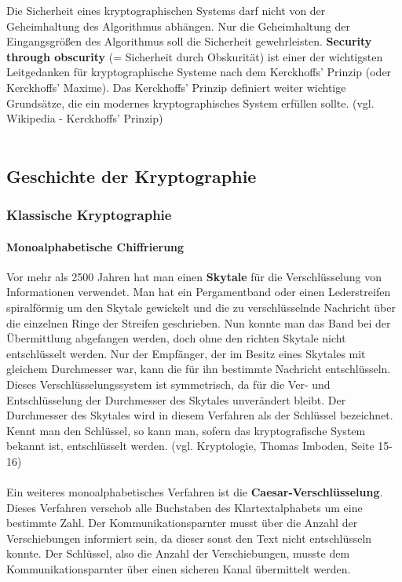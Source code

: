 \documentclass[12pt,a4paper]{report}
\begin{document}
Die Sicherheit eines kryptographischen Systems darf nicht von der Geheimhaltung des Algorithmus abhängen. Nur die Geheimhaltung der Eingangsgrößen des Algorithmus soll die Sicherheit gewehrleisten. \textbf{Security through obscurity} (= Sicherheit durch Obskurität) ist einer der wichtigsten Leitgedanken für kryptographische Systeme nach dem Kerckhoffs' Prinzip (oder Kerckhoffs' Maxime). Das Kerckhoffs' Prinzip definiert weiter wichtige Grundsätze, die ein modernes kryptographisches System erfüllen sollte. (vgl. Wikipedia - Kerckhoffs' Prinzip)\\\\

\subsection{Geschichte der Kryptographie}

\subsubsection{Klassische Kryptographie}

\paragraph{Monoalphabetische Chiffrierung}

Vor mehr als 2500 Jahren hat man einen \textbf{Skytale} für die Verschlüsselung von Informationen verwendet. Man hat ein Pergamentband oder einen Lederstreifen spiralförmig um den Skytale gewickelt und die zu verschlüsselnde Nachricht über die einzelnen Ringe der Streifen geschrieben. Nun konnte man das Band bei der Übermittlung abgefangen werden, doch ohne den richten Skytale nicht entschlüsselt werden. Nur der Empfänger, der im Besitz eines Skytales mit gleichem Durchmesser war, kann die für ihn bestimmte Nachricht entschlüsseln. Dieses Verschlüsselungssystem ist symmetrisch, da für die Ver- und Entschlüsselung der Durchmesser des Skytales unverändert bleibt. Der Durchmesser des Skytales wird in diesem Verfahren als der Schlüssel bezeichnet. Kennt man den Schlüssel, so kann man, sofern das kryptografische System bekannt ist, entschlüsselt werden. (vgl. Kryptologie, Thomas Imboden, Seite 15-16)\\\\

Ein weiteres monoalphabetisches Verfahren ist die \textbf{Caesar-Verschlüsselung}. Dieses Verfahren verschob alle Buchstaben des Klartextalphabets um eine bestimmte Zahl. Der Kommunikationsparnter musst über die Anzahl der Verschiebungen informiert sein, da dieser sonst den Text nicht entschlüsseln konnte. Der Schlüssel, also die Anzahl der Verschiebungen, musste dem Kommunikationsparnter über einen sicheren Kanal übermittelt werden.\\\\
\end{document}
